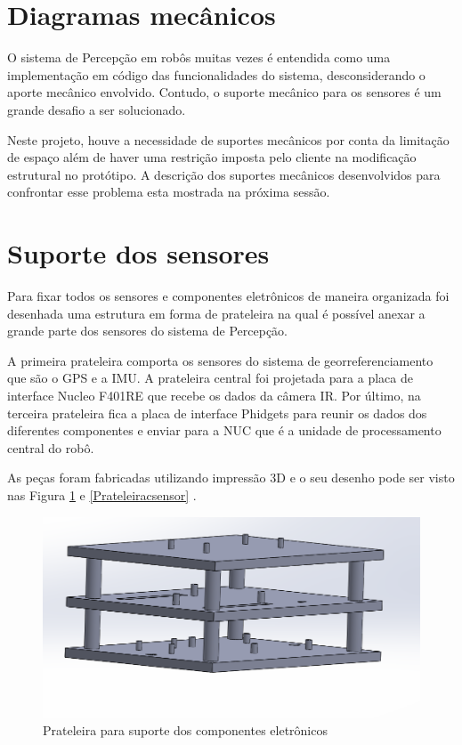 	\section{Diagramas mecânicos}
	\label{sec:diagm}
	O sistema de Percepção em robôs muitas vezes é entendida como uma implementação em código das funcionalidades do sistema, desconsiderando o aporte mecânico envolvido. Contudo, o suporte mecânico para os sensores é um grande desafio a ser solucionado. 
	
	Neste projeto, houve a necessidade de suportes mecânicos por conta da limitação de espaço além de haver uma restrição imposta pelo cliente na modificação estrutural no protótipo. A descrição dos suportes mecânicos desenvolvidos para confrontar esse problema esta mostrada na próxima sessão.
	
	\section{Suporte dos sensores}
	
	Para  fixar  todos  os  sensores  e  componentes  eletrônicos  de  maneira  organizada foi desenhada uma estrutura em forma de prateleira  na qual é possível anexar a grande parte dos sensores do sistema de Percepção.
	
	A primeira prateleira comporta os sensores do sistema de georreferenciamento que são o GPS e a IMU. A prateleira central foi projetada para a placa de interface Nucleo F401RE que recebe os dados da câmera IR. Por último, na terceira prateleira fica a placa de interface Phidgets para reunir os dados dos diferentes componentes e enviar para a NUC que é a  unidade de processamento central do robô.
	
	As peças foram fabricadas utilizando impressão 3D e o seu desenho pode ser visto nas Figura \ref{Prateleira} e \ref{Prateleiracsensor} .
	
	\begin{figure}[h]
		\centering
		\includegraphics[width=14cm]{Figures/prateleira.png}
		\caption{Prateleira para suporte dos componentes eletrônicos} \label{Prateleira}
	\end{figure}
	
